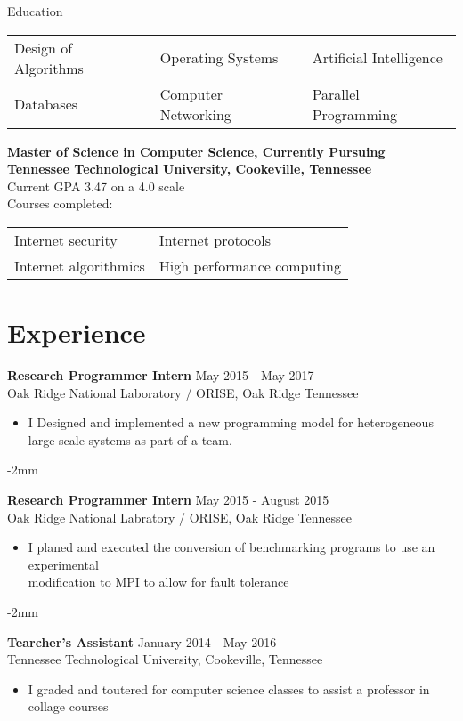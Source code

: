 \documentclass[10pt]{res}
\newcommand{\job}[5]{
    {\bf #1} \hfill #2 \\
    #3 #4
    #5
}
\newcommand{\tightensection}{\vspace{-5mm}}
\begin{document}
\begin{resume}
\begin{section}{Education}
    \vspace{-0.15in}
    \begin{tabularx}{\textwidth}{l l l}
        Design of Algorithms & Operating Systems & Artificial Intelligence \\
        Databases & Computer Networking & Parallel Programming \\
    \end{tabularx}

    {\bf Master of Science in Computer Science, Currently Pursuing\\
    Tennessee Technological University, Cookeville, Tennessee} \\
    Current GPA 3.47 on a 4.0 scale \\
    Courses completed:

    \vspace{-0.15in}
    \begin{tabularx}{\textwidth}{l l}
        Internet security & Internet protocols \\
        Internet algorithmics & High performance computing \\
    \end{tabularx}
\end{section}
%
\tightensection
%
\section{Experience}
\job{Research Programmer Intern} {May 2015 - May 2017} {Oak Ridge National Laboratory / ORISE, Oak Ridge Tennessee}
{
\begin{itemize} \itemsep -2pt  %
         \item {I Designed and implemented a new programming model for 
             heterogeneous large scale systems as part of a team.}
\end{itemize}
}
\vspace{-2mm}
\job{Research Programmer Intern} {May 2015 - August 2015}
{Oak Ridge National Labratory / ORISE, Oak Ridge Tennessee}
{
\begin{itemize} \itemsep -2pt  %
         \item {I planed and executed the conversion of benchmarking 
             programs to use an experimental\\ 
             modification to MPI to allow for fault tolerance}
\end{itemize}
}

\vspace{-2mm}
\job{Tearcher's Assistant} {January 2014 - May 2016}
{Tennessee Technological University, Cookeville, Tennessee}
{
\begin{itemize} \itemsep -2pt  %
         \item {I graded and toutered for computer science classes to assist a 
                professor in collage courses}
\end{itemize}
}


\end{resume}
\end{document}

